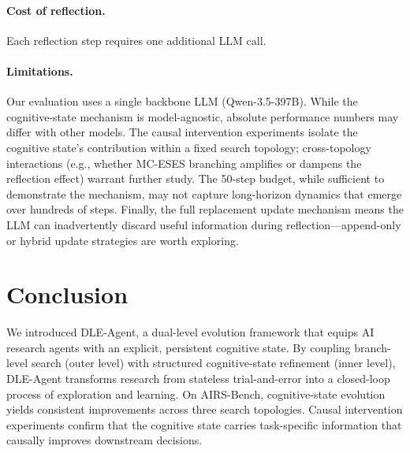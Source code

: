 \documentclass{article} %
\begin{document}

\paragraph{Cost of reflection.}
Each reflection step requires one additional LLM call.

\paragraph{Limitations.}
Our evaluation uses a single backbone LLM (Qwen-3.5-397B). While the
cognitive-state mechanism is model-agnostic, absolute performance numbers may
differ with other models. The causal intervention experiments isolate the
cognitive state's contribution within a fixed search topology; cross-topology
interactions (e.g., whether MC-ESES branching amplifies or dampens the
reflection effect) warrant further study. The 50-step budget, while sufficient
to demonstrate the mechanism, may not capture long-horizon dynamics that emerge
over hundreds of steps. Finally, the full replacement update mechanism means
the LLM can inadvertently discard useful information during
reflection---append-only or hybrid update strategies are worth exploring.


\section{Conclusion}
\label{sec:conclusion}

We introduced DLE-Agent, a dual-level evolution framework that equips AI
research agents with an explicit, persistent cognitive state. By coupling
branch-level search (outer level) with structured cognitive-state refinement
(inner level), DLE-Agent transforms research from stateless trial-and-error
into a closed-loop process of exploration and learning. On AIRS-Bench,
cognitive-state evolution yields consistent improvements across three search
topologies. Causal intervention experiments confirm that the cognitive state
carries task-specific information that causally improves downstream decisions.
\end{document}
